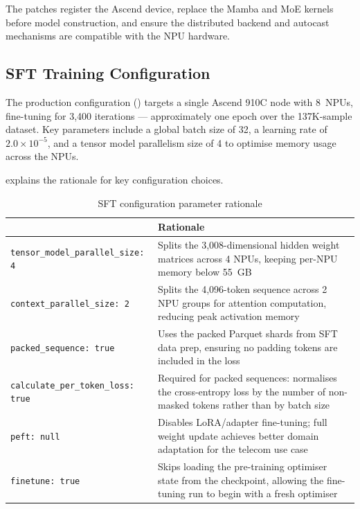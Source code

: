The patches register the Ascend device, replace the Mamba and MoE kernels
before model construction, and ensure the distributed backend and autocast
mechanisms are compatible with the NPU hardware.

\subsection{SFT Training Configuration}
\label{sec:sft-config}

The production configuration ()
targets a single Ascend 910C node with 8~NPUs, fine-tuning for
3,400 iterations — approximately one epoch over the 137K-sample
dataset. Key parameters include a global batch size of 32, a learning rate
of $2.0 \times 10^{-5}$, and a tensor model parallelism size of 4 to
optimise memory usage across the NPUs.

 explains the rationale for key
configuration choices.

\begin{table}[htbp]
  \centering
  \caption{SFT configuration parameter rationale}
  \label{tab:config-rationale}
  \begin{tabularx}{\textwidth}{lX}
    \toprule
    \tableheader{Parameter & Rationale} \\
    \midrule
    \texttt{tensor\_model\_parallel\_size: 4}
      & Splits the 3,008-dimensional hidden weight matrices across 4
        NPUs, keeping per-NPU memory below 55~GB \\
    \rowcolor{TableRowOdd}
    \texttt{context\_parallel\_size: 2}
      & Splits the 4,096-token sequence across 2 NPU groups for
        attention computation, reducing peak activation memory \\
    \texttt{packed\_sequence: true}
      & Uses the packed Parquet shards from SFT data prep, ensuring
        no padding tokens are included in the loss \\
    \rowcolor{TableRowOdd}
    \texttt{calculate\_per\_token\_loss: true}
      & Required for packed sequences: normalises the cross-entropy
        loss by the number of non-masked tokens rather than by batch
        size \\
    \texttt{peft: null}
      & Disables LoRA/adapter fine-tuning; full weight update
        achieves better domain adaptation for the telecom use case \\
    \rowcolor{TableRowOdd}
    \texttt{finetune: true}
      & Skips loading the pre-training optimiser state from the
        checkpoint, allowing the fine-tuning run to begin with a
        fresh optimiser \\
    \bottomrule
  \end{tabularx}
\end{table}

